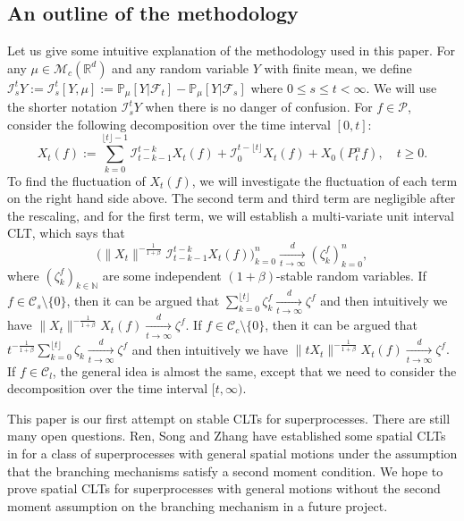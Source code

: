 \documentclass[EJP]{ejpecp} %
\begin{document}
\subsection{An outline of the methodology}
	Let us give some intuitive explanation of the methodology used in this paper.
	For any $\mu\in \mathcal M_c(\mathbb R^d)$ and any random variable $Y$ with finite mean, we define $\mathcal I_s^t Y:= \mathcal I_s^t [Y, \mu] := \mathbb P_\mu[Y|\mathscr F_t] - \mathbb P_\mu[Y|\mathscr F_s]$ where $0 \leq s \leq t <\infty.$
	We will use the shorter notation $\mathcal I_s^t Y$ when there is no danger of confusion.
	For $f\in \mathcal{P}$, consider the following decomposition over the time interval $[0,t]$:
\[
	X_t(f)
	:= \sum_{k=0}^{\lfloor t \rfloor-1} \mathcal I_{t-k-1}^{t-k} X_t (f)+\mathcal I_0^{t-\lfloor t \rfloor} X_t(f) + X_0( P^\alpha_tf),
	\quad t\geq 0.
\]
	To find the fluctuation of $X_t(f)$, we will investigate the fluctuation of each term on the right hand side above.
	The second term and third term are negligible after the rescaling, and for the first term, we will establish a multi-variate unit interval CLT,  which says that
\[
  	\Big( \|X_t\|^{-\frac{1}{1+\beta}}\mathcal I^{t-k}_{t-k-1} X_t(f) \Big)_{k=0}^n
  	\xrightarrow [t\to \infty]{d} (\zeta^f_k)_{k=0}^n,
\]
	where $(\zeta^f_k)_{k \in \mathbb N}$ 
	are some independent 
	$(1+\beta)$-stable random variables.
	If $f \in \mathcal C_s\setminus\{0\}$, then it can be argued that $\sum_{k=0}^{\lfloor t \rfloor} \zeta^f_k \xrightarrow[t\to \infty]{d} \zeta^f$ and then intuitively we have $\|X_t\|^{-\frac{1}{1+\beta}}  X_t(f) \xrightarrow[t\to \infty]{d} \zeta^f.$
	If $f \in \mathcal C_c \setminus \{0\}$, then it can be argued that $ t^{-\frac{1}{1+\beta}} \sum_{k=0}^{\lfloor t\rfloor} \zeta_k \xrightarrow[t\to \infty]{ d} \zeta^f$ and then intuitively we have $\|tX_t\|^{-\frac{1}{1+\beta}}  X_t(f) \xrightarrow[t\to \infty]{d} \zeta^f.$
	If $f\in \mathcal C_l$, the general idea is almost the same, except that we need to consider the decomposition over the time interval $[t,\infty)$.

	This paper is our first attempt on stable CLTs for superprocesses.
	There are still many open questions.
	Ren, Song and Zhang have established some spatial  CLTs in \cite{RenSongZhang2015Central} for a class of superprocesses with general spatial motions under the assumption that the branching mechanisms satisfy a second moment condition.
	We hope to prove spatial CLTs for superprocesses with general motions without the second moment assumption on the branching mechanism in a future project.
\end{document}
